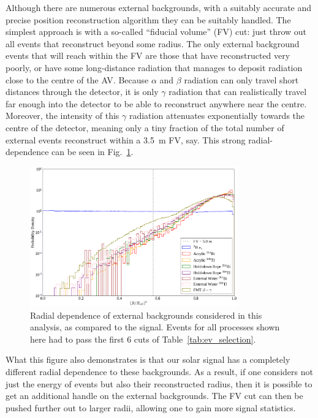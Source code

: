 Although there are numerous external backgrounds, with a suitably accurate and precise position reconstruction algorithm they can be suitably handled. The simplest approach is with a so-called ``fiducial volume'' (FV) cut: just throw out all events that reconstruct beyond some radius. The only external background events that will reach within the FV are those that have reconstructed very poorly, or have some long-distance radiation that manages to deposit radiation close to the centre of the AV. %
Because $\alpha$ and $\beta$ radiation can only travel short distances through the detector, it is only $\gamma$ %
radiation that can realistically travel far enough into the detector to be able to reconstruct anywhere near the centre. Moreover, the intensity of this $\gamma$ radiation attenuates exponentially towards the centre of the detector, meaning only a tiny fraction of the total number of external events reconstruct within a \SI{3.5}{\metre} FV, say. This strong radial-dependence can be seen in Fig.~\ref{fig:external_radial_dependence}.

\begin{figure}
    \centering
    \includegraphics[width=0.8\textwidth]{6_SolarAnalysis/images/externals_radial_plot.pdf}
    \caption[Radial dependence of external backgrounds considered in this analysis, as compared to the \beight{} signal]
    {Radial dependence of external backgrounds considered in this analysis, as compared to the \beight{} signal. Events for all processes shown here had to pass the first 6 cuts of Table~\ref{tab:ev_selection}.}
    \label{fig:external_radial_dependence}
\end{figure}

What this figure also demonstrates is that our solar signal has a completely different radial dependence to these backgrounds. As a result, if one considers not just the energy of events but also their reconstructed radius, then it is possible to get an additional handle on the external backgrounds. The FV cut can then be pushed further out to larger radii, allowing one to gain more signal statistics.

